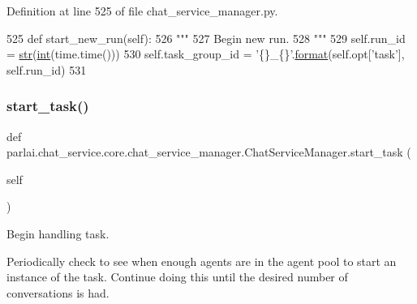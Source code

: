Definition at line 525 of file chat\+\_\+service\+\_\+manager.\+py.


\begin{DoxyCode}
525     \textcolor{keyword}{def }start\_new\_run(self):
526         \textcolor{stringliteral}{"""}
527 \textcolor{stringliteral}{        Begin new run.}
528 \textcolor{stringliteral}{        """}
529         self.run\_id = \hyperlink{namespacegenerate__task__READMEs_a5b88452ffb87b78c8c85ececebafc09f}{str}(\hyperlink{namespacelanguage__model_1_1eval__ppl_a7d12ee00479673c5c8d1f6d01faa272a}{int}(time.time()))
530         self.task\_group\_id = \textcolor{stringliteral}{'\{\}\_\{\}'}.\hyperlink{namespaceparlai_1_1chat__service_1_1services_1_1messenger_1_1shared__utils_a32e2e2022b824fbaf80c747160b52a76}{format}(self.opt[\textcolor{stringliteral}{'task'}], self.run\_id)
531 
\end{DoxyCode}
\mbox{\label{classparlai_1_1chat__service_1_1core_1_1chat__service__manager_1_1ChatServiceManager_a207c63f2a66acae0dc8b04c528036e8b}} 
\subsubsection{\texorpdfstring{start\+\_\+task()}{start\_task()}}
{\footnotesize\ttfamily def parlai.\+chat\+\_\+service.\+core.\+chat\+\_\+service\+\_\+manager.\+Chat\+Service\+Manager.\+start\+\_\+task (\begin{DoxyParamCaption}\item[{}]{self }\end{DoxyParamCaption})}

\begin{DoxyVerb}Begin handling task.

Periodically check to see when enough agents are in the agent pool to start an
instance of the task. Continue doing this until the desired number of
conversations is had.
\end{DoxyVerb}
 

